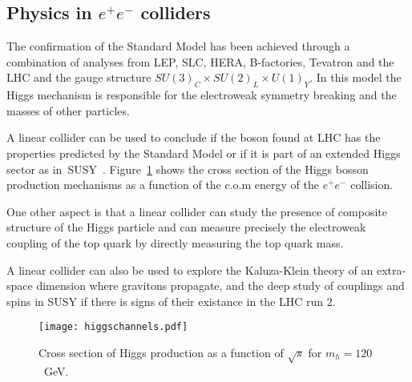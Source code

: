 \subsection{Physics in \texorpdfstring{$e^+e^-$}{e+e-} colliders}
The confirmation of the Standard Model has been achieved through a combination of analyses from LEP, SLC, HERA, B-factories, Tevatron and the LHC and the gauge structure $SU(3)_C\times SU(2)_L\times U(1)_Y$. In this model the Higgs mechanism is responsible for the electroweak symmetry breaking and the masses of other particles.\par
A linear collider can be used to conclude if the boson found at LHC has the properties predicted by the Standard Model or if it is part of an extended Higgs sector as in~SUSY~\cites{Ellis:2008gj,Accomando:2004sz,Assmann:2000hg}. Figure~\ref{f:higgsch} shows the cross section of the Higgs bosson production mechanisms as a function of the c.o.m energy of the $e^+e^-$ collision.\par
One other aspect is that a linear collider can study the presence of composite structure of the Higgs particle and can measure precisely the electroweak coupling of the top quark by directly measuring the top quark mass.\par
A linear collider can also be used to explore the Kaluza-Klein theory of an extra-space dimension where gravitons propagate, and the deep study of couplings and spins in SUSY if there is signs of their existance in the LHC run 2.\par
\begin{figure}[h]
\centering
\texttt{[image: higgschannels.pdf]}\caption{Cross section of Higgs production as a function of $\sqrt{s}$ for $m_h=120$~GeV.}\label{f:higgsch}
\end{figure}
 

